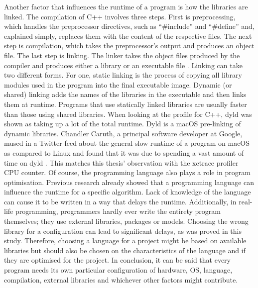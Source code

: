 Another factor that influences the runtime of a program is how the libraries are linked. The compilation of C++ involves three steps. First is preprocessing, which handles the preprocessor directives, such as “\#include” and “\#define” and, explained simply, replaces them with the content of the respective files. The next step is compilation, which takes the preprocessor’s output and produces an object file. The last step is linking. The linker takes the object files produced by the compiler and produces either a library or an executable file \cite{linking}. Linking can take two different forms. For one, static linking is the process of copying all library modules used in the program into the final executable image. Dynamic (or shared) linking adds the names of the libraries in the executable and then links them at runtime. Programs that use statically linked libraries are usually faster than those using shared libraries. When looking at the profile for C++, dyld was shown as taking up a lot of the total runtime. Dyld is a macOS pre-linking of dynamic libraries. Chandler Caruth, a principal software developer at Google, mused in a Twitter feed about the general slow runtime of a program on macOS as compared to Linux and found that it was due to spending a vast amount of time on dyld \cite{twitter}. This matches this thesis' observation with the xctrace profiler CPU counter.
Of course, the programming language also plays a role in program optimisation. Previous research already showed that a programming language can influence the runtime for a specific algorithm. Lack of knowledge of the language can cause it to be written in a way that delays the runtime. Additionally, in real-life programming, programmers hardly ever write the entirety program themselves; they use external libraries, packages or models. Choosing the wrong library for a configuration can lead to significant delays, as was proved in this study. Therefore, choosing a language for a project might be based on available libraries but should also be chosen on the characteristics of the language and if they are optimised for the project. In conclusion, it can be said that every program needs its own particular configuration of hardware, OS, language, compilation, external libraries and whichever other factors might contribute.
